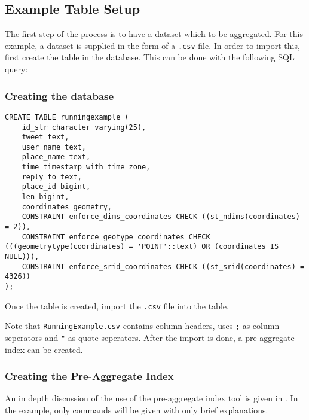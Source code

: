 \subsection{Example Table Setup}

The first step of the process is to have a dataset which to be
aggregated. For this example, a dataset is supplied in the form of a
\lstinline|.csv| file. In order to import this, first create the table in
the database. This can be done with the following SQL query:

\subsubsection{Creating the database}

\begin{lstlisting}
CREATE TABLE runningexample (
	id_str character varying(25),
	tweet text,
	user_name text,
	place_name text,
	time timestamp with time zone,
	reply_to text,
	place_id bigint,
	len bigint,
	coordinates geometry,
	CONSTRAINT enforce_dims_coordinates CHECK ((st_ndims(coordinates) = 2)),
	CONSTRAINT enforce_geotype_coordinates CHECK (((geometrytype(coordinates) = 'POINT'::text) OR (coordinates IS NULL))),
	CONSTRAINT enforce_srid_coordinates CHECK ((st_srid(coordinates) = 4326))
);
\end{lstlisting}

Once the table is created, import the \lstinline|.csv| file into the table.

Note that \lstinline|RunningExample.csv| contains column headers, uses
\lstinline|;| as column seperators and \lstinline|"| as quote seperators.
After the import is done, a pre-aggregate index can be created.

\subsubsection{Creating the Pre-Aggregate Index}
\label{sec:examplePreAggIndex}

An in depth discussion of the use of the pre-aggregate index tool is given
in . In the example, only commands will be given with
only brief explanations.

